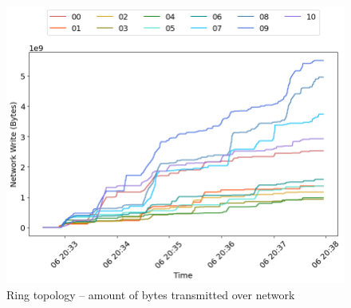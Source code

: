 \begin{minipage}{0.5\linewidth}
\begin{figure}[H]
\captionsetup{justification=centering,width=0.8\linewidth}
\includegraphics[width=\linewidth]{figures/ring/net_write.png}
\caption{Ring topology -- amount of bytes transmitted over network}
\label{fig:ring-net_write}
\end{figure}
\end{minipage}

